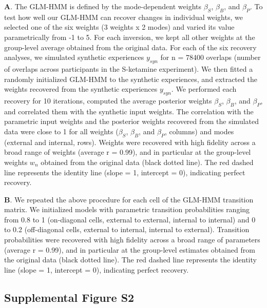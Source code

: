 \documentclass[
]{article}
\begin{document}
\textbf{A}. The GLM-HMM is defined by the mode-dependent weights
\(\beta_S\), \(\beta_B\), and \(\beta_P\). To test how well our GLM-HMM
can recover changes in individual weights, we selected one of the six
weights (3 weights x 2 modes) and varied its value parametrically from
-1 to 5. For each inversion, we kept all other weights at the
group-level average obtained from the original data. For each of the six
recovery analyses, we simulated synthetic experiences \(y_{syn}\) for n
= 78400 overlaps (number of overlaps across participants in the
S-ketamine experiment). We then fitted a randomly initialized GLM-HMM to
the synthetic experiences, and extracted the weights recovered from the
synthetic experiences \(y_{syn}\). We performed each recovery for 10
iterations, computed the average posterior weights \(\beta_S\),
\(\beta_B\), and \(\beta_P\), and correlated them with the synthetic
input weights. The correlation with the parametric input weights and the
posterior weights recovered from the simulated data were close to 1 for
all weights (\(\beta_S\), \(\beta_B\), and \(\beta_P\), columns) and
modes (external and internal, rows). Weights were recovered with high
fidelity across a broad range of weights (average r = 0.99), and in
particular at the group-level weights \(w_n\) obtained from the original
data (black dotted line). The red dashed line represents the identity
line (slope = 1, intercept = 0), indicating perfect recovery.

\textbf{B}. We repeated the above procedure for each cell of the GLM-HMM
transition matrix. We initialized models with parametric transition
probabilities ranging from 0.8 to 1 (on-diagonal cells, external to
external, internal to internal) and 0 to 0.2 (off-diagonal cells,
external to internal, internal to external). Transition probabilities
were recovered with high fidelity across a broad range of parameters
(average r = 0.99), and in particular at the group-level estimates
obtained from the original data (black dotted line). The red dashed line
represents the identity line (slope = 1, intercept = 0), indicating
perfect recovery.

\newpage

\subsection{Supplemental Figure S2}\label{supplemental-figure-s2}
\end{document}
